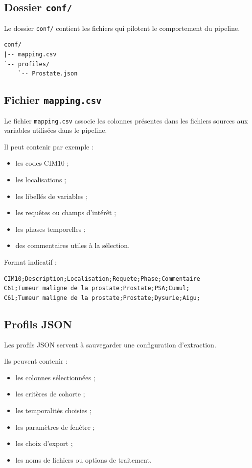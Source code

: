 \documentclass[11pt,a4paper]{article}
\newcommand{\code}[1]{\texttt{#1}}
\begin{document}
\subsection{Dossier \code{conf/}}

Le dossier \code{conf/} contient les fichiers qui pilotent le comportement du pipeline.

\begin{lstlisting}
conf/
|-- mapping.csv
`-- profiles/
    `-- Prostate.json
\end{lstlisting}

\subsection{Fichier \code{mapping.csv}}

Le fichier \code{mapping.csv} associe les colonnes présentes dans les fichiers sources aux variables utilisées dans le pipeline.

Il peut contenir par exemple :
\begin{itemize}
  \item les codes CIM10 ;
  \item les localisations ;
  \item les libellés de variables ;
  \item les requêtes ou champs d'intérêt ;
  \item les phases temporelles ;
  \item des commentaires utiles à la sélection.
\end{itemize}

Format indicatif :

\begin{lstlisting}
CIM10;Description;Localisation;Requete;Phase;Commentaire
C61;Tumeur maligne de la prostate;Prostate;PSA;Cumul;
C61;Tumeur maligne de la prostate;Prostate;Dysurie;Aigu;
\end{lstlisting}

\subsection{Profils JSON}

Les profils JSON servent à sauvegarder une configuration d'extraction.

Ils peuvent contenir :
\begin{itemize}
  \item les colonnes sélectionnées ;
  \item les critères de cohorte ;
  \item les temporalités choisies ;
  \item les paramètres de fenêtre ;
  \item les choix d'export ;
  \item les noms de fichiers ou options de traitement.
\end{itemize}
\end{document}
